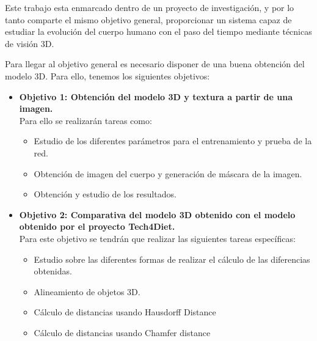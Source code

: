 
Este trabajo esta enmarcado dentro de un proyecto de investigación, y por lo tanto comparte el mismo objetivo general, proporcionar un sistema capaz de estudiar la evolución del cuerpo humano con el paso del tiempo mediante técnicas de visión 3D. 

Para llegar al objetivo general es necesario disponer de una buena obtención del modelo 3D. Para ello, tenemos los siguientes objetivos:


\begin{itemize}
	\item{\textbf{Objetivo 1: Obtención del modelo 3D y textura a partir de una imagen.}} 
	\\Para ello se realizarán tareas como:
	\begin{itemize}
		\item Estudio de los diferentes parámetros para el entrenamiento y prueba de la red.
		\item Obtención de imagen del cuerpo y generación de máscara de la imagen.
		\item Obtención y estudio de los resultados.
		
		
	\end{itemize}
	\item{\textbf{Objetivo 2: Comparativa del modelo 3D obtenido con el modelo obtenido por el proyecto Tech4Diet. }} \\
	Para este objetivo se tendrán que realizar las siguientes tareas específicas:
	\begin{itemize}
		\item Estudio sobre las diferentes formas de realizar el cálculo de las diferencias obtenidas.
		\item Alineamiento de objetos 3D.
		\item Cálculo de distancias usando Hausdorff Distance
		\item Cálculo de distancias usando Chamfer distance
	\end{itemize}
\end{itemize}

\label{sec:Introducción}

